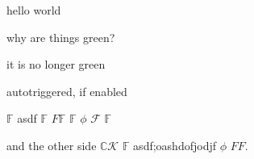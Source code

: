 \documentclass{article}
\begin{document}
hello world

why are things green?

it is no longer green

autotriggered, if enabled \(\)

\lipsum[1-5] \(\mathbb{F}\) asdf \(\mathbb{F}\) \(F\mathbb{F}\) \(\mathbb{F}\) \(\phi\) \(\mathcal{F}\) \(\mathbb{F}\)

and the other side \(\mathbb{C}\mathcal{K}\) \(\mathbb{F}\) asdf;oashdofjodjf \(\phi\) \(FF\).
\end{document}
